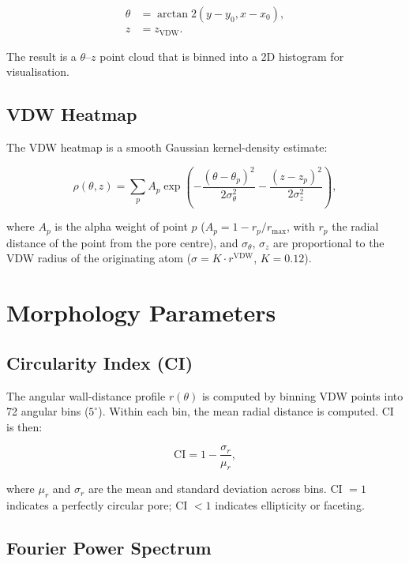 \documentclass[11pt,a4paper]{article}
\begin{document}
\begin{align}
\theta &= \arctan2(y - y_0, x - x_0), \\
z     &= z_{\text{VDW}}.
\end{align}

The result is a $\theta$--$z$ point cloud that is binned into a 2D
histogram for visualisation.

\subsection{VDW Heatmap}

The VDW heatmap is a smooth Gaussian kernel-density estimate:

\begin{equation}
\rho(\theta, z) = \sum_p A_p \exp\!\left(
-\frac{(\theta - \theta_p)^2}{2\sigma_\theta^2}
-\frac{(z - z_p)^2}{2\sigma_z^2}
\right),
\end{equation}

where $A_p$ is the alpha weight of point $p$
($A_p = 1 - r_p / r_{\max}$, with $r_p$ the radial distance of the point
from the pore centre), and $\sigma_\theta$, $\sigma_z$ are proportional
to the VDW radius of the originating atom ($\sigma = K \cdot r^{\text{VDW}}$,
$K = 0.12$).

\section{Morphology Parameters}

\subsection{Circularity Index (CI)}

The angular wall-distance profile $r(\theta)$ is computed by binning VDW
points into 72 angular bins ($5^\circ$).  Within each bin, the mean
radial distance is computed.  CI is then:

\begin{equation}
\text{CI} = 1 - \frac{\sigma_r}{\mu_r},
\end{equation}

where $\mu_r$ and $\sigma_r$ are the mean and standard deviation across
bins.  CI $= 1$ indicates a perfectly circular pore; CI $< 1$ indicates
ellipticity or faceting.

\subsection{Fourier Power Spectrum}
\end{document}
